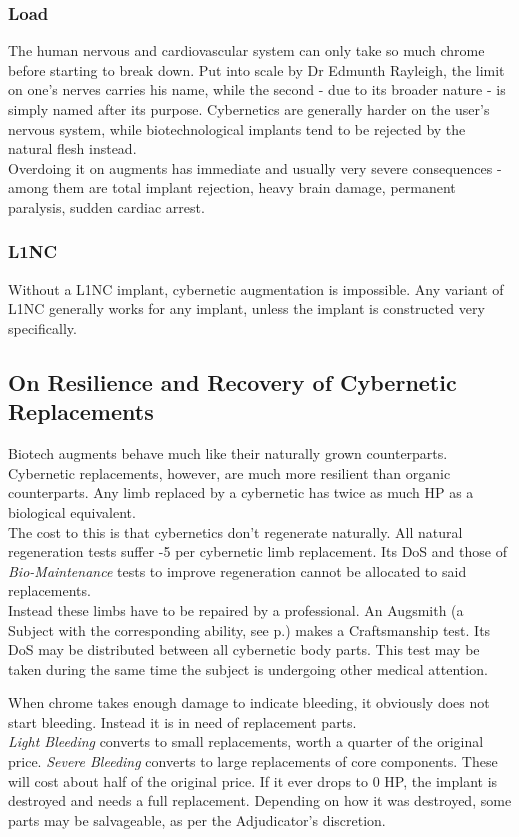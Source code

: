 	\subsubsection{Load}
	The human nervous and cardiovascular system can only take so much chrome before starting to break down.
	Put into scale by Dr Edmunth Rayleigh, the limit on one's nerves carries his name, while the second - due to its broader nature - is simply named after its purpose.
	Cybernetics are generally harder on the user's nervous system, while biotechnological implants tend to be rejected by the natural flesh instead.\\
	Overdoing it on augments has immediate and usually very severe consequences - among them are total implant rejection, heavy brain damage, permanent paralysis, sudden cardiac arrest.
	\subsubsection{L1NC}
	Without a L1NC implant, cybernetic augmentation is impossible.
	Any variant of L1NC generally works for any implant, unless the implant is constructed very specifically.
\subsection{On Resilience and Recovery of Cybernetic Replacements}
Biotech augments behave much like their naturally grown counterparts.
Cybernetic replacements, however, are much more resilient than organic counterparts.
Any limb replaced by a cybernetic has twice as much HP as a biological equivalent.
\\%
The cost to this is that cybernetics don't regenerate naturally.
All natural regeneration tests suffer -5 per cybernetic limb replacement.
Its DoS and those of \emph{Bio-Maintenance} tests to improve regeneration cannot be allocated to said replacements.
\\%
Instead these limbs have to be repaired by a professional.
An Augsmith (a Subject with the corresponding ability, see p.\pageref{ability:augsmith}) makes a Craftsmanship test.
Its DoS may be distributed between all cybernetic body parts.
This test may be taken during the same time the subject is undergoing other medical attention.
\par%
When chrome takes enough damage to indicate bleeding,
it obviously does not start bleeding.
Instead it is in need of replacement parts.
\\%
\emph{Light Bleeding} converts to small replacements, worth a quarter of the original price.
\emph{Severe Bleeding} converts to large replacements of core components.
These will cost about half of the original price.
If it ever drops to 0 HP,
the implant is destroyed and needs a full replacement.
Depending on how it was destroyed,
	some parts may be salvageable,
	as per the Adjudicator's discretion.

